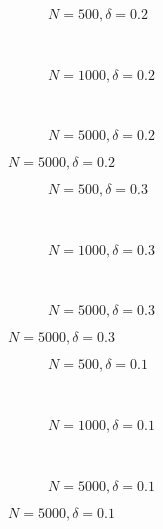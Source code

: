 \documentclass{beamer}
\begin{document}
\begin{frame}
\begin{figure}[h]
  \scriptsize
  \begingroup
  \centering
  \begin{subfigure}[b]{0.31\textwidth}
\caption{\footnotesize $N=500, \delta = 0.2$}
  
  \end{subfigure}
  ~
  \begin{subfigure}[b]{0.31\textwidth}
    \caption{\footnotesize $N=1000, \delta = 0.2$} 
  
  \end{subfigure}
  ~
  \begin{subfigure}[b]{0.31\textwidth}
\caption{\footnotesize $N=5000, \delta = 0.2$}
  
  \end{subfigure}
\endgroup
\end{figure}
\end{frame}
\begin{frame}
\begin{figure}[h]
  \scriptsize
  \begingroup
  \centering
  \begin{subfigure}[b]{0.31\textwidth}
\caption{\footnotesize $N=500, \delta = 0.3$}
  
  \end{subfigure}
  ~
  \begin{subfigure}[b]{0.31\textwidth}
    \caption{\footnotesize $N=1000, \delta = 0.3$} 
  
  \end{subfigure}
  ~
  \begin{subfigure}[b]{0.31\textwidth}
\caption{\footnotesize $N=5000, \delta = 0.3$}
  
  \end{subfigure}
\endgroup
\end{figure}
\end{frame}
\begin{frame}
\begin{figure}[h]
  \scriptsize
  \begingroup
  \centering
  \begin{subfigure}[b]{0.31\textwidth}
\caption{\footnotesize $N=500, \delta = 0.1$}
  
  \end{subfigure}
  ~
  \begin{subfigure}[b]{0.31\textwidth}
    \caption{\footnotesize $N=1000, \delta = 0.1$} 
  
  \end{subfigure}
  ~
  \begin{subfigure}[b]{0.31\textwidth}
\caption{\footnotesize $N=5000, \delta = 0.1$}
  
  \end{subfigure}
\endgroup
\end{figure}
\end{frame}
\end{document}
